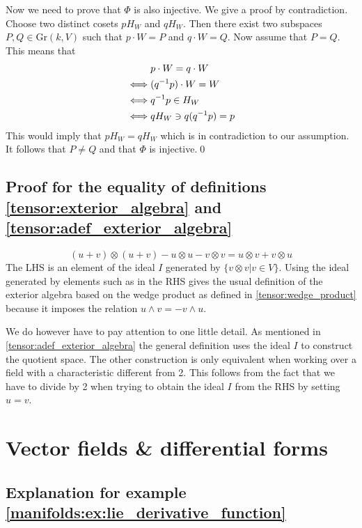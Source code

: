 	Now we need to prove that $\Phi$ is also injective. We give a proof by contradiction. Choose two distinct cosets $pH_W$ and $qH_W$. Then there exist two subspaces $P, Q\in \text{Gr}(k, V)$ such that $p\cdot W = P$ and $q\cdot W = Q$. Now assume that $P = Q$. This means that
	\begin{align*}
		&p\cdot W = q\cdot W\\
		\iff&(q^{-1}p)\cdot W = W\\
		\iff&q^{-1}p\in H_W\\
		\iff&qH_W\mathrel{\reflectbox{$\in$}}q(q^{-1}p) = p
	\end{align*}
	This would imply that $pH_W = qH_W$ which is in contradiction to our assumption. It follows that $P\neq Q$ and that $\Phi$ is injective.\qed

\subsection{Proof for the equality of definitions \ref{tensor:exterior_algebra} and \ref{tensor:adef_exterior_algebra}}
	\begin{equation}
		(u+v)\otimes(u+v) - u\otimes u - v\otimes v = u\otimes v + v\otimes u
	\end{equation}
	The LHS is an element of the ideal $I$ generated by $\{v\otimes v|v\in V\}$. Using the ideal generated by elements such as in the RHS gives the usual definition of the exterior algebra based on the wedge product as defined in \ref{tensor:wedge_product} because it imposes the relation $u\wedge v = -v\wedge u$.
	
	We do however have to pay attention to one little detail. As mentioned in \ref{tensor:adef_exterior_algebra} the general definition uses the ideal $I$ to construct the quotient space. The other construction is only equivalent when working over a field with a characteristic different from 2. This follows from the fact that we have to divide by 2 when trying to obtain the ideal $I$ from the RHS by setting $u=v$.

\section{Vector fields \& differential forms}
\subsection{Explanation for example \ref{manifolds:ex:lie_derivative_function}}


